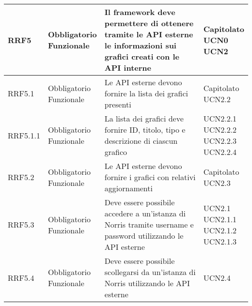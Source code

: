 \begin{longtabu}[c]{|X[0.7,l]|X[l]|X[2.5,l]|X[l]|}
                RRF5 & 
                \parbox[t]{4cm}{ Obbligatorio \\ Funzionale} & Il framework deve permettere di ottenere tramite le API esterne le informazioni sui grafici creati con le API interne & \parbox[t]{4cm}{Capitolato \\ UCN0 \\ UCN2 }  \\ 
                \hline
                
                RRF5.1 & 
                \parbox[t]{4cm}{ Obbligatorio \\ Funzionale} & Le API esterne devono fornire la lista dei grafici presenti & \parbox[t]{4cm}{Capitolato \\ UCN2.2 }  \\ 
                \hline
                
                RRF5.1.1 & 
                \parbox[t]{4cm}{ Obbligatorio \\ Funzionale} & La lista dei grafici deve fornire ID, titolo, tipo e descrizione di ciascun grafico & \parbox[t]{4cm}{UCN2.2.1 \\ UCN2.2.2 \\ UCN2.2.3 \\ UCN2.2.4 }  \\ 
                \hline
                
                RRF5.2 & 
                \parbox[t]{4cm}{ Obbligatorio \\ Funzionale} & Le API esterne devono fornire i grafici con relativi aggiornamenti & \parbox[t]{4cm}{Capitolato \\ UCN2.3 }  \\ 
                \hline
                
                RRF5.3 & 
                \parbox[t]{4cm}{ Obbligatorio \\ Funzionale} & Deve essere possibile accedere a un'istanza di Norris tramite username e password utilizzando le API esterne & \parbox[t]{4cm}{UCN2.1 \\ UCN2.1.1 \\ UCN2.1.2 \\ UCN2.1.3 }  \\ 
                \hline
                
                RRF5.4 & 
                \parbox[t]{4cm}{ Obbligatorio \\ Funzionale} & Deve essere possibile scollegarsi da un'istanza di Norris utilizzando le API esterne & \parbox[t]{4cm}{UCN2.4 }  \\ 
                \hline
                

\end{longtabu}
